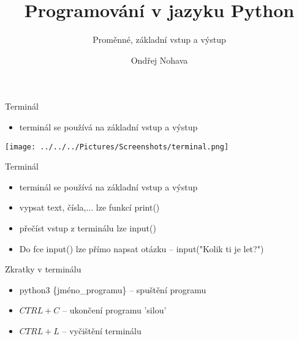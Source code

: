 \documentclass{beamer}
\title{Programování v jazyku Python}
\subtitle{Proměnné, základní vstup a výstup}
\author{Ondřej Nohava}
\institute[DDMJH]{Dům dětí a mládeže Jindřichův Hradec}
\date{}
\begin{document}
\begin{frame}
\titlepage
\end{frame}

\begin{frame}[t]{Terminál}

\begin{itemize}
	\item terminál se používá na základní vstup a výstup
\end{itemize}

\vspace{0.3cm}
\begin{center}
\texttt{[image: ../../../Pictures/Screenshots/terminal.png]} 
\end{center}

\end{frame}

\begin{frame}[t]{Terminál}
\begin{itemize}
	\item terminál se používá na základní vstup a výstup
	
	\item vypsat text, čísla,... lze funkcí \textsf{print()}
	
	\item přečíst vstup z terminálu lze \textsf{input()}
	
	\pause
	
	\item Do fce \textsf{input()} lze přímo napsat otázku -- \textsf{input("Kolik ti je let?")}
\end{itemize}
\end{frame}


\begin{frame}[t]{Zkratky v terminálu}

\begin{itemize}
	\item python3 \{jméno\_programu\} -- spuštění programu
	
	\item $CTRL + C$ -- ukončení programu 'silou'
	
	\item $CTRL + L$ -- vyčištění terminálu
\end{itemize}

\end{frame}
\end{document}
